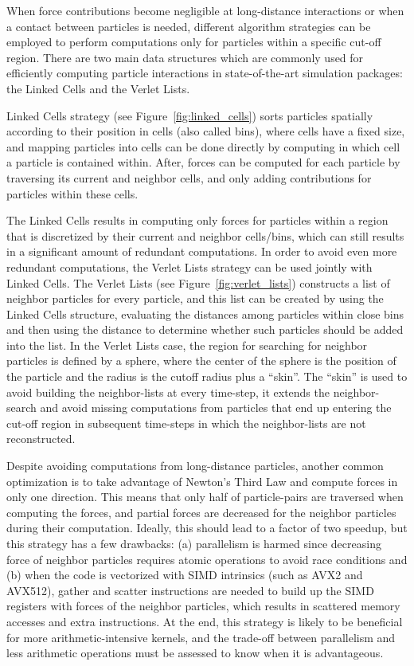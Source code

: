 \documentclass[preprint,12pt]{elsarticle}
\begin{document}
When force contributions become negligible at long-distance interactions or when a contact between particles is needed, different algorithm strategies can be employed to perform computations only for particles within a specific cut-off region.
There are two main data structures which are commonly used for efficiently computing particle interactions in state-of-the-art simulation packages: the Linked Cells and the Verlet Lists.

Linked Cells strategy (see Figure~\ref{fig:linked_cells}) sorts particles spatially according to their position in cells (also called bins), where cells have a fixed size, and mapping particles into cells can be done directly by computing in which cell a particle is contained within.
After, forces can be computed for each particle by traversing its current and neighbor cells, and only adding contributions for particles within these cells.

The Linked Cells results in computing only forces for particles within a region that is discretized by their current and neighbor cells/bins, which can still results in a significant amount of redundant computations.
In order to avoid even more redundant computations, the Verlet Lists strategy can be used jointly with Linked Cells.
The Verlet Lists (see Figure~\ref{fig:verlet_lists}) constructs a list of neighbor particles for every particle, and this list can be created by using the Linked Cells structure, evaluating the distances among particles within close bins and then using the distance to determine whether such particles should be added into the list.
In the Verlet Lists case, the region for searching for neighbor particles is defined by a sphere, where the center of the sphere is the position of the particle and the radius is the cutoff radius plus a ``skin''.
The ``skin'' is used to avoid building the neighbor-lists at every time-step, it extends the neighbor-search and avoid missing computations from particles that end up entering the cut-off region in subsequent time-steps in which the neighbor-lists are not reconstructed.

Despite avoiding computations from long-distance particles, another common optimization is to take advantage of Newton's Third Law and compute forces in only one direction.
This means that only half of particle-pairs are traversed when computing the forces, and partial forces are decreased for the neighbor particles during their computation.
Ideally, this should lead to a factor of two speedup, but this strategy has a few drawbacks: (a) parallelism is harmed since decreasing force of neighbor particles requires atomic operations to avoid race conditions and (b) when the code is vectorized with SIMD intrinsics (such as AVX2 and AVX512), gather and scatter instructions are needed to build up the SIMD registers with forces of the neighbor particles, which results in scattered memory accesses and extra instructions.
At the end, this strategy is likely to be beneficial for more arithmetic-intensive kernels, and the trade-off between parallelism and less arithmetic operations must be assessed to know when it is advantageous.
\end{document}
